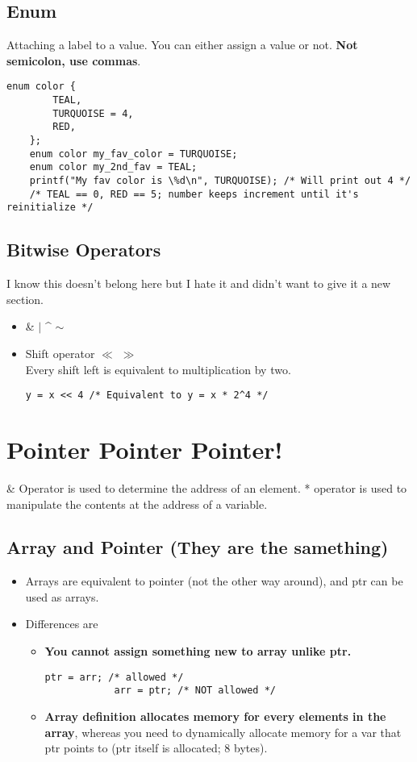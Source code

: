 \documentclass{article}
\begin{document}
\subsection{Enum}
Attaching a label to a value. You can either assign a value or not. \textbf{Not semicolon, use commas}.
\begin{lstlisting}[style=CStyle]
    enum color {
        TEAL,
        TURQUOISE = 4,
        RED,
    };
    enum color my_fav_color = TURQUOISE;
    enum color my_2nd_fav = TEAL;
    printf("My fav color is \%d\n", TURQUOISE); /* Will print out 4 */
    /* TEAL == 0, RED == 5; number keeps increment until it's reinitialize */
\end{lstlisting}

\subsection{Bitwise Operators}
I know this doesn't belong here but I hate it and didn't want to give it a new section.
\begin{itemize}
    \item \& $\mid$ \^{} $\sim$
    \item Shift operator $\ll$ $\gg$\\
    Every shift left is equivalent to multiplication by two.
    \begin{lstlisting}[style=CStyle]
        y = x << 4 /* Equivalent to y = x * 2^4 */
    \end{lstlisting}
\end{itemize}

\section{Pointer Pointer Pointer!}
\& Operator is used to determine the address of an element. * operator is used to manipulate the contents at the address of a variable.

\subsection{Array and Pointer (They are the samething)}
\begin{itemize}
    \item Arrays are equivalent to pointer (not the other way around), and ptr can be used as arrays.
    \item Differences are
    \begin{itemize}
        \item \textbf{You cannot assign something new to array unlike ptr.}
        \begin{lstlisting}[style=CStyle]
            ptr = arr; /* allowed */
            arr = ptr; /* NOT allowed */
        \end{lstlisting}
        \item \textbf{Array definition allocates memory for every elements in the array}, whereas you need to dynamically allocate memory for a var that ptr points to (ptr itself is allocated; 8 bytes).
    \end{itemize}
\end{itemize}
\end{document}
